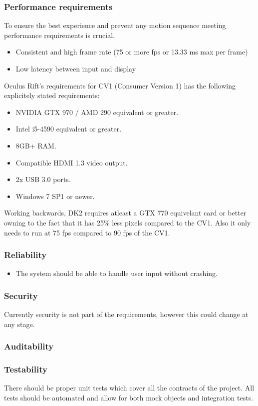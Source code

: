 \documentclass[a4paper,12pt]{article}
\begin{document}
\subsubsection{Performance requirements}
To ensure the best experience and prevent any motion sequence meeting performance requirements is crucial.
	\begin{itemize}
		\item Consistent and high frame rate (75 or more fps or 13.33 ms max per frame)
		\item Low latency between input and display
	\end{itemize}
Oculus Rift's requirements for CV1 (Consumer Version 1) has the following explicitely stated requirements:
\begin{itemize}
	\item NVIDIA GTX 970 / AMD 290 equivalent or greater.
	\item Intel i5-4590 equivalent or greater.
	\item 8GB+ RAM.
	\item Compatible HDMI 1.3 video output.
	\item 2x USB 3.0 ports.
	\item Windows 7 SP1 or newer.
\end{itemize}
Working backwards, DK2 requires atleast a GTX 770 equivelant card or better owning to the fact that it has 25\% less pixels compared to the CV1. Also it only needs to run at 75 fps compared to 90 fps of the CV1.
\subsubsection{Reliability}
	\begin{itemize}
		\item The system should be able to handle user input without crashing.
	\end{itemize}

\subsubsection{Security}
Currently security is not part of the requirements, however this could change at any stage.

\subsubsection{Auditability}

\subsubsection{Testability}
There should be proper unit tests which cover all the contracts of the project. All tests should be automated and allow for both mock objects and integration tests.
\end{document}

